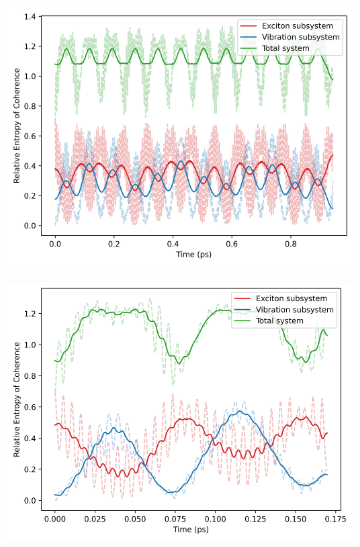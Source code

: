 \documentclass[11pt]{article}
\begin{document}
\begin{figure}[H]
    \centering
    \begin{subfigure}{0.49\textwidth}
        \centering
        \includegraphics[width=\linewidth]{Research Project/Code/results/ExVib/Closed/Envelope/coh_eg.png}
        \caption{}
        \label{fig:EVM_CQS_Coh_env_eg}
    \end{subfigure}
    \hfill
    \begin{subfigure}{0.49\textwidth}
        \centering
        \includegraphics[width=\linewidth]{Research Project/Code/results/ExVib/Closed/Fast/coh_eg.png}
        \caption{}
        \label{fig:EVM_CQS_Coh_fast_eg}
    \end{subfigure}
    
    \caption{}
    \label{fig:EVM_CQS_Coh_eg}
\end{figure}
\end{document}
